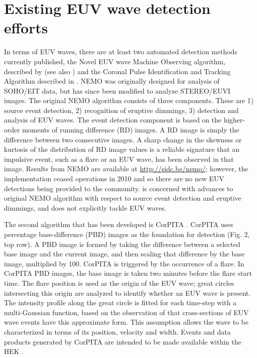 \section{Existing EUV wave detection efforts}\label{sec:existing}


In terms of EUV waves, there are at least two automated
detection methods currently published, the Novel EUV wave Machine
Observing algorithm, described by \cite{2005SoPh..228..265P} (see also
\cite{2012SoPh..276..479P}) and the Coronal Pulse Identification and
Tracking Algorithm described in \cite{2014SoPh..289.3279L}. NEMO was
originally designed for analysis of SOHO/EIT data, but has since been
modified to analyze STEREO/EUVI images. The original NEMO algorithm
\cite{2005SoPh..228..265P} consists of three components. These are 1)
source event detection, 2) recognition of eruptive dimmings, 3)
detection and analysis of EUV waves. The event detection component is
based on the higher-order moments of running difference (RD) images. A
RD image is simply the difference between two consecutive images. A
sharp change in the skewness or kurtosis of the distribution of RD
image values is a reliable signature that an impulsive event, such as
a flare or an EUV wave, has been observed in that image.  Results from NEMO are available at \url{http://sidc.be/nemo/};
however, the implementation ceased operations in 2010 and so there are
no new EUV detections being provided to the community.
\cite{2012SoPh..276..479P} is concerned with advances to original NEMO
algorithm with respect to source event detection and eruptive
dimmings, and does not explicitly tackle EUV waves.



The second algorithm that has been developed is CorPITA
\citep{2014SoPh..289.3279L}. CorPITA uses percentage base-difference
(PBD) images as the foundation for detection (Fig. 2, top row).  A PBD
image is formed by taking the difference between a selected base image
and the current image, and then scaling that difference by the base
image, multiplied by 100.  CorPITA is triggered by the occurrence of a
flare.  In CorPITA PBD images, the base image is taken two minutes
before the flare start time. The flare position is used as the origin
of the EUV wave; great circles intersecting this origin are analyzed
to identify whether an EUV wave is present. The intensity profile
along the great circle is fitted for each time-step with a
multi-Gaussian function, based on the observation of
\cite{2006ApJ...645..757W} that cross-sections of EUV wave events have
this approximate form. This assumption allows the wave to be
characterized in terms of its position, velocity and width. Events and
data products generated by CorPITA are intended to be made available
within the HEK \citep{hek2012, 2012SoPh..275...79M}.  

